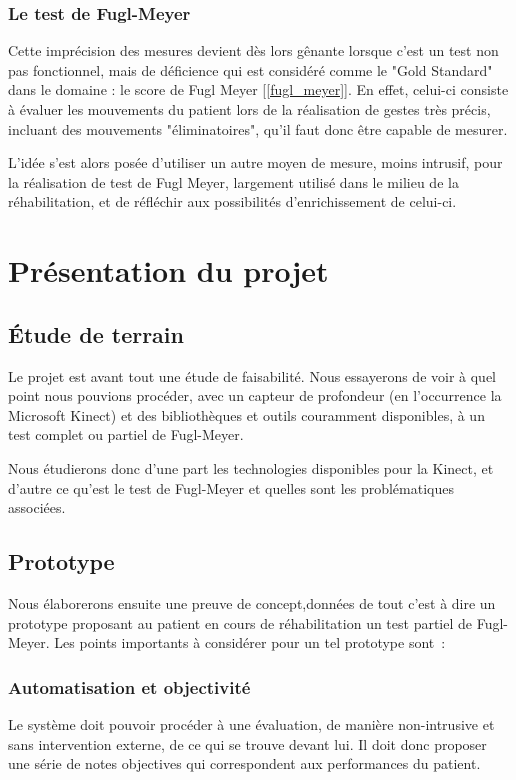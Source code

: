     \subsubsection{Le test de Fugl-Meyer}
Cette imprécision des mesures devient dès lors gênante lorsque c'est un test non pas fonctionnel, mais de déficience qui est considéré comme le "Gold Standard" dans le domaine : le score de Fugl Meyer [\ref{fugl_meyer}]. En effet, celui-ci consiste à évaluer les mouvements du patient lors de la réalisation de gestes très précis, incluant des mouvements "éliminatoires", qu'il faut donc être capable de mesurer.  
  
  L'idée s'est alors posée d'utiliser un autre moyen de mesure, moins intrusif, pour la réalisation de test de Fugl Meyer, largement utilisé dans le milieu de la réhabilitation, et de réfléchir aux possibilités d'enrichissement de celui-ci.
\newpage
    \section{Présentation du projet}
    
      \subsection{Étude de terrain} \label{etude_terrain}
    Le projet est avant tout une étude de faisabilité. Nous essayerons de voir
    à quel point nous pouvions procéder, avec un capteur de profondeur (en
    l'occurrence la Microsoft Kinect) et des bibliothèques et outils couramment 
    disponibles, à un test complet ou partiel de Fugl-Meyer.
    
    Nous étudierons donc d'une part les technologies disponibles pour la Kinect,
    et d'autre ce qu'est le test de Fugl-Meyer et quelles sont les 
    problématiques associées.
    
    \subsection{Prototype}
    Nous élaborerons ensuite une preuve de concept,données de tout c'est à dire un 
    prototype proposant au patient en cours de réhabilitation un test partiel 
    de Fugl-Meyer. Les points importants à considérer pour un tel prototype 
    sont~:
    \subsubsection{Automatisation et objectivité}
    Le système doit pouvoir procéder à une évaluation, de manière non-intrusive 
    et sans intervention externe, de ce qui se trouve devant lui. Il doit donc 
    proposer une série de notes objectives qui correspondent aux performances du 
    patient.

